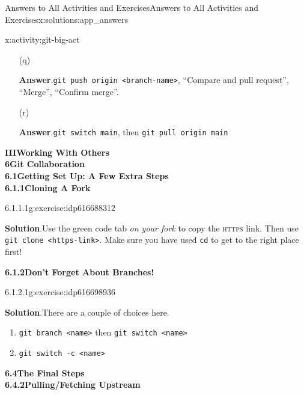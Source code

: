 \documentclass[oneside,10pt,]{book}
\newcommand{\blocktitlefont}{\relax}
\newcommand{\mono}[1]{\texttt{#1}}
\newcommand{\initialism}[1]{\textsc{\MakeLowercase{#1}}}
\begin{document}
\begin{solutions-chapter}{Answers to All Activities and Exercises}{}{Answers to All Activities and Exercises}{}{}{x:solutions:app_answers}
\begin{activitysolution}{4.11}{}{x:activity:git-big-act}
\begin{enumerate}[font=\bfseries,label=(\alph*),ref=\alph*]
\item[(q)]\par\smallskip%
\noindent\textbf{\blocktitlefont Answer}.\hypertarget{g:answer:idp616576312-back}{}\quad{}\mono{git push origin <branch-name>}, ``Compare and pull request'', ``Merge'', ``Confirm merge''.%
\item[(r)]\par\smallskip%
\noindent\textbf{\blocktitlefont Answer}.\hypertarget{g:answer:idp616574648-back}{}\quad{}\mono{git switch main}, then \mono{git pull origin main}%
\end{enumerate}
\end{activitysolution}%
\par\medskip
\noindent\textbf{\Large{}III\space\textperiodcentered\space{}Working With Others\\
6\space\textperiodcentered\space{}Git Collaboration\\
6.1\space\textperiodcentered\space{}Getting Set Up: A Few Extra Steps\\
6.1.1\space\textperiodcentered\space{}Cloning A Fork}
\begin{inlinesolution}{6.1.1.1}{}{g:exercise:idp616688312}%
\par\smallskip%
\noindent\textbf{\blocktitlefont Solution}.\hypertarget{g:solution:idp616683448-back}{}\quad{}Use the green code tab \emph{on your fork} to copy the \initialism{HTTPS} link. Then use \mono{git clone <https-link>}. Make sure you have used \mono{cd} to get to the right place first!%
\end{inlinesolution}%
\par\medskip
\noindent\textbf{\Large{}6.1.2\space\textperiodcentered\space{}Don't Forget About Branches!}
\begin{inlinesolution}{6.1.2.1}{}{g:exercise:idp616698936}%
\par\smallskip%
\noindent\textbf{\blocktitlefont Solution}.\hypertarget{g:solution:idp616697016-back}{}\quad{}There are a couple of choices here.%
\begin{enumerate}
\item{}\mono{git branch <name>} then \mono{git switch <name>}%
\item{}\mono{git switch -c <name>}%
\end{enumerate}
%
\end{inlinesolution}%
\par\medskip
\noindent\textbf{\Large{}6.4\space\textperiodcentered\space{}The Final Steps\\
6.4.2\space\textperiodcentered\space{}Pulling\slash{}Fetching Upstream}

\end{solutions-chapter}
\end{document}
